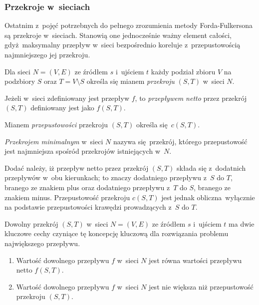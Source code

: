 \subsubsection{\textbf{Przekroje w~sieciach}}
\par{
  Ostatnim z~pojęć potrzebnych do pełnego zrozumienia metody Forda-Fulkersona są przekroje w~sieciach.
  Stanowią one jednocześnie ważny element całości, gdyż maksymalny przepływ w~sieci bezpośrednio koreluje z~przepustowością najmniejszego jej przekroju.
  \begin{definition}
    Dla sieci $N=(V, E)$ ze źródłem $s$ i~ujściem $t$ każdy podział zbioru $V$ na podzbiory $S$ oraz $T=V\setminus S$ określa się mianem \emph{przekroju} $(S,T)$ w~sieci $N$.

    Jeżeli w~sieci zdefiniowany jest przepływ $f$, to \emph{przepływem netto} przez przekrój $(S, T)$ definiowany jest jako $f(S, T)$.

    Mianem \emph{przepustowości} przekroju $(S, T)$ określa się $c(S, T)$.

    \emph{Przekrojem minimalnym} w~sieci $N$ nazywa się przekrój, którego przepustowość jest najmniejsza spośród przekrojów istniejących w~$N$.
  \end{definition}
}
\par{
  Dodać należy, iż przepływ netto przez przekrój $(S, T)$ składa się z~dodatnich przepływów w~obu kierunkach; to znaczy dodatniego przepływu z~$S$ do $T$, branego ze znakiem plus oraz dodatniego przepływu z~$T$ do $S$, branego ze znakiem minus.
  Przepustowość przekroju $c(S, T)$ jest jednak obliczna wyłącznie na podstawie przepustowości krawędzi prowadzących z~$S$ do $T$.
}
\par{
  Dowolny przekrój $(S, T)$ w~sieci $N=(V, E)$ ze źródłem $s$ i~ujściem $t$ ma dwie kluczowe cechy czyniące tę koncepcję kluczową dla rozwiązania problemu największego przepływu.
  \begin{enumerate}
    \item Wartość dowolnego przepływu $f$ w~sieci $N$ jest równa wartości przepływu netto $f(S,T)$.
    \item Wartość dowolnego przepływu $f$ w~sieci $N$ jest nie większa niż przepustowość przekroju $(S, T)$.
  \end{enumerate}
}
